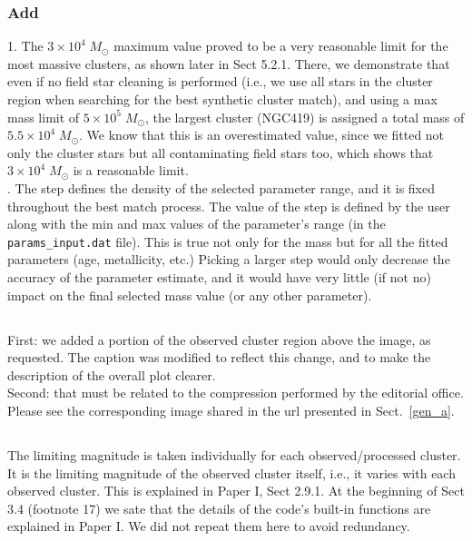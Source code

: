 \documentclass{article}
\begin{document}
\subsubsection{Add}

1.
The $3\times10^4\;M_{\odot}$ maximum value proved to be a very
reasonable limit for the most massive clusters, as shown later in Sect 5.2.1.
There, we demonstrate that even if no field star cleaning is performed (i.e., we
use all stars in the cluster region when searching for the best synthetic
cluster match), and using a max mass limit of $5\times10^5\;M_{\odot}$, the
largest cluster (NGC419) is assigned a total mass of $5.5\times10^4\;M_{\odot}$.
We know that this is an overestimated value, since we fitted not only the
cluster stars but all contaminating field stars too, which shows that
$3\times10^4\;M_{\odot}$ is a reasonable limit.\\

.
The step defines the density of the selected parameter range, and it is fixed
throughout the best match process. The value of the step
is defined by the user along with the min and max values of the parameter's
range (in the \texttt{params\_input.dat} file). This is true not only for the
mass but for all the fitted parameters (age, metallicity, etc.)
Picking a larger step would only decrease the accuracy of the parameter
estimate, and it would have very little (if not no) impact on the final
selected mass value (or any other parameter).

\subsection{}
First: we added a portion of the observed cluster region above the image, as
requested. The caption was modified to reflect this change, and to make the
description of the overall plot clearer.\\

\noindent Second: that must be related to the compression performed by the
editorial office. Please see the corresponding image shared in the url presented
in Sect.~\ref{gen_a}.

\subsection{}
\label{sec:8}
The limiting magnitude is taken individually for each observed/processed
cluster. It is the limiting magnitude of the observed cluster itself, i.e., it
varies with each observed cluster.
This is explained in Paper I, Sect 2.9.1. At the beginning of Sect 3.4 
(footnote 17) we sate that the details of the code's built-in functions are
explained in Paper I. We did not repeat them here to avoid redundancy.
\end{document}
